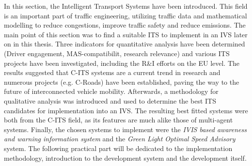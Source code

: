\documentclass[main.tex]{subfiles}
\begin{document}
In this section, the Intelligent Transport Systems have been introduced. This field is an
important part of traffic engineering, utilizing traffic data and mathematical modelling to
reduce congestions, improve traffic safety and reduce emissions. The main point of this section
was to find a suitable ITS to implement in an IVS later on in this thesis. Three indicators for
quantitative analysis have been determined (Driver engagement, MAS-compatibilit, research
relevance) and various ITS projects have been investigated, including the R\&I efforts on the
EU level. The results suggested that C-ITS systems are a current trend in research and numerous
projects (e.g. C-Roads) have been established, paving the way to the future of interconnected
vehicle mobility. Afterwards, a methodology for qualitative analysis was introduced and used to
determine the best ITS candidates for implementation into an IVS. The resulting best fitted
systems were both from the C-ITS field, as its features are much alike those of multi-agent
systems. Finally, the chosen systems to implement were the \emph{IVIS based awareness and
warning information system} and the \emph{Green Light Optimal Speed Advisory} system. The
following practical part will be dedicated to the implementation methodology, introduction to
the development system and the development itself.
\clearpage
\end{document}
